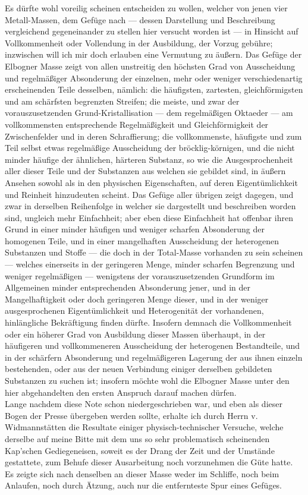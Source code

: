 \documentclass[a4paper, 11pt, oneside, german]{article}
\begin{document}
{Es dürfte wohl voreilig scheinen entscheiden zu wollen, welcher von jenen vier Metall-Massen, dem Gefüge nach --- dessen Darstellung und Beschreibung vergleichend gegeneinander zu stellen hier versucht worden ist --- in Hinsicht auf Vollkommenheit oder Vollendung in der Ausbildung, der Vorzug gebühre; inzwischen will ich mir doch erlauben eine Vermutung zu äußern. Das Gefüge der Elbogner Masse zeigt von allen unstreitig den höchsten Grad von Ausscheidung und regelmäßiger Absonderung der einzelnen, mehr oder weniger verschiedenartig erscheinenden Teile desselben, nämlich: die häufigsten, zartesten, gleichförmigsten und am schärfsten begrenzten Streifen; die meiste, und zwar der vorauszusetzenden Grund-Kristallisation --- dem regelmäßigen Oktaeder --- am vollkommensten entsprechende Regelmäßigkeit und Gleichförmigkeit der Zwischenfelder und in deren Schraffierung; die vollkommenste, häufigste und zum Teil selbst etwas regelmäßige Ausscheidung der bröcklig-körnigen, und die nicht minder häufige der ähnlichen, härteren Substanz, so wie die Ausgesprochenheit aller dieser Teile und der Substanzen aus welchen sie gebildet sind, in äußern Ansehen sowohl als in den physischen Eigenschaften, auf deren Eigentümlichkeit und Reinheit hinzudeuten scheint. Das Gefüge aller übrigen zeigt dagegen, und zwar in derselben Reihenfolge in welcher sie dargestellt und beschreiben worden sind, ungleich mehr Einfachheit; aber eben diese Einfachheit hat offenbar ihren Grund in einer minder häufigen und weniger scharfen Absonderung der homogenen Teile, und in einer mangelhaften Ausscheidung der heterogenen Substanzen und Stoffe --- die doch in der Total-Masse vorhanden zu sein scheinen --- welches einerseits in der geringeren Menge, minder scharfen Begrenzung und weniger regelmäßigen --- wenigstens der vorauszusetzenden Grundform im Allgemeinen minder entsprechenden Absonderung jener, und in der Mangelhaftigkeit oder doch geringeren Menge dieser, und in der weniger ausgesprochenen Eigentümlichkeit und Heterogenität der vorhandenen, hinlängliche Bekräftigung finden dürfte. Insofern demnach die Vollkommenheit oder ein höherer Grad von Ausbildung dieser Massen überhaupt, in der häufigeren und vollkommeneren Ausscheidung der heterogenen Bestandteile, und in der schärfern Absonderung und regelmäßigeren Lagerung der aus ihnen einzeln bestehenden, oder aus der neuen Verbindung einiger derselben gebildeten Substanzen zu suchen ist; insofern möchte wohl die Elbogner Masse unter den hier abgehandelten den ersten Anspruch darauf machen dürfen.\\
Lange nachdem diese Note schon niedergeschrieben war, und eben als dieser Bogen der Presse übergeben werden sollte, erhalte ich durch Herrn v. Widmannstätten die Resultate einiger physisch-technischer Versuche, welche derselbe auf meine Bitte mit dem uns so sehr problematisch scheinenden Kap’schen Gediegeneisen, soweit es der Drang der Zeit und der Umstände gestattete, zum Behufe dieser Ausarbeitung noch vorzunehmen die Güte hatte. Es zeigte sich nach denselben an dieser Masse weder im Schliffe, noch beim Anlaufen, noch durch Ätzung, auch nur die entfernteste Spur eines Gefüges.\\
}
\end{document}
